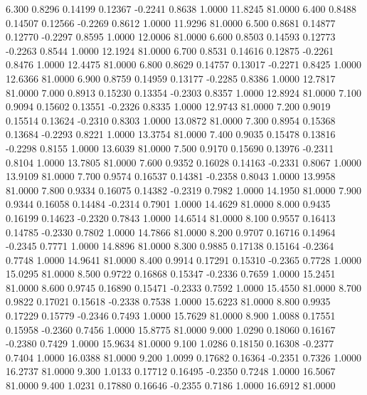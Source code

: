    6.300   0.8296   0.14199   0.12367  -0.2241   0.8638   1.0000  11.8245  81.0000
   6.400   0.8488   0.14507   0.12566  -0.2269   0.8612   1.0000  11.9296  81.0000
   6.500   0.8681   0.14877   0.12770  -0.2297   0.8595   1.0000  12.0006  81.0000
   6.600   0.8503   0.14593   0.12773  -0.2263   0.8544   1.0000  12.1924  81.0000
   6.700   0.8531   0.14616   0.12875  -0.2261   0.8476   1.0000  12.4475  81.0000
   6.800   0.8629   0.14757   0.13017  -0.2271   0.8425   1.0000  12.6366  81.0000
   6.900   0.8759   0.14959   0.13177  -0.2285   0.8386   1.0000  12.7817  81.0000
   7.000   0.8913   0.15230   0.13354  -0.2303   0.8357   1.0000  12.8924  81.0000
   7.100   0.9094   0.15602   0.13551  -0.2326   0.8335   1.0000  12.9743  81.0000
   7.200   0.9019   0.15514   0.13624  -0.2310   0.8303   1.0000  13.0872  81.0000
   7.300   0.8954   0.15368   0.13684  -0.2293   0.8221   1.0000  13.3754  81.0000
   7.400   0.9035   0.15478   0.13816  -0.2298   0.8155   1.0000  13.6039  81.0000
   7.500   0.9170   0.15690   0.13976  -0.2311   0.8104   1.0000  13.7805  81.0000
   7.600   0.9352   0.16028   0.14163  -0.2331   0.8067   1.0000  13.9109  81.0000
   7.700   0.9574   0.16537   0.14381  -0.2358   0.8043   1.0000  13.9958  81.0000
   7.800   0.9334   0.16075   0.14382  -0.2319   0.7982   1.0000  14.1950  81.0000
   7.900   0.9344   0.16058   0.14484  -0.2314   0.7901   1.0000  14.4629  81.0000
   8.000   0.9435   0.16199   0.14623  -0.2320   0.7843   1.0000  14.6514  81.0000
   8.100   0.9557   0.16413   0.14785  -0.2330   0.7802   1.0000  14.7866  81.0000
   8.200   0.9707   0.16716   0.14964  -0.2345   0.7771   1.0000  14.8896  81.0000
   8.300   0.9885   0.17138   0.15164  -0.2364   0.7748   1.0000  14.9641  81.0000
   8.400   0.9914   0.17291   0.15310  -0.2365   0.7728   1.0000  15.0295  81.0000
   8.500   0.9722   0.16868   0.15347  -0.2336   0.7659   1.0000  15.2451  81.0000
   8.600   0.9745   0.16890   0.15471  -0.2333   0.7592   1.0000  15.4550  81.0000
   8.700   0.9822   0.17021   0.15618  -0.2338   0.7538   1.0000  15.6223  81.0000
   8.800   0.9935   0.17229   0.15779  -0.2346   0.7493   1.0000  15.7629  81.0000
   8.900   1.0088   0.17551   0.15958  -0.2360   0.7456   1.0000  15.8775  81.0000
   9.000   1.0290   0.18060   0.16167  -0.2380   0.7429   1.0000  15.9634  81.0000
   9.100   1.0286   0.18150   0.16308  -0.2377   0.7404   1.0000  16.0388  81.0000
   9.200   1.0099   0.17682   0.16364  -0.2351   0.7326   1.0000  16.2737  81.0000
   9.300   1.0133   0.17712   0.16495  -0.2350   0.7248   1.0000  16.5067  81.0000
   9.400   1.0231   0.17880   0.16646  -0.2355   0.7186   1.0000  16.6912  81.0000
